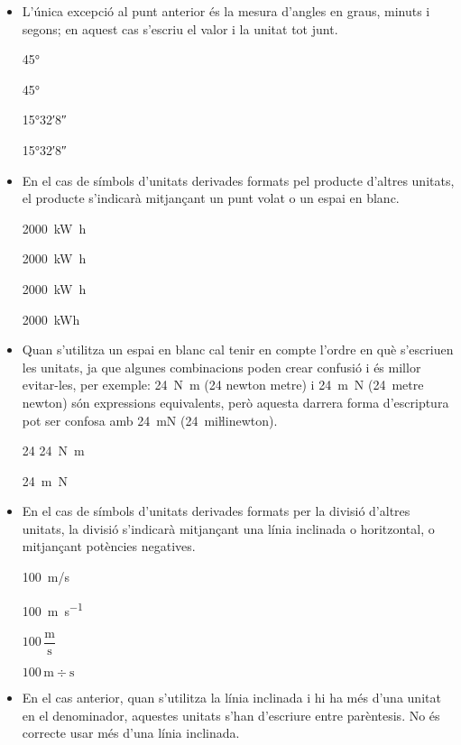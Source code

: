 \begin{itemize}
\item  L'única excepció al punt anterior és la mesura d'angles en graus, minuts i segons; en aquest cas s'escriu el valor i la unitat tot junt.

\textcolor{Green}\faCheckSquare{} \ang{45}

\textcolor{Red}\faTimesCircle{} \ang[number-angle-product = \,]{45}

\textcolor{Green}\faCheckSquare{} \ang{15;32;8}

\textcolor{Red}\faTimesCircle{} \ang[number-angle-product = \,]{15;32;8}

\item En el cas de símbols d'unitats derivades formats pel producte
d'altres unitats, el producte s'indicarà mitjançant un punt volat o
un espai en blanc.

\textcolor{Green}\faCheckSquare{} \qty[inter-unit-product=\cdot]{2000}{kW.h}

\textcolor{Green}\faCheckSquare{} \qty{2000}{kW.h}

\textcolor{Red}\faTimesCircle{} \qty[inter-unit-product=-]{2000}{kW.h}

\textcolor{Red}\faTimesCircle{} \qty{2000}{kWh}

\item Quan s'utilitza un espai en blanc cal tenir en compte  l'ordre en què s'escriuen
les unitats, ja que algunes combinacions poden crear confusió i
és millor evitar-les, per exemple: \qty{24}{N.m} (24 newton metre) i
\qty{24}{m.N} (24~metre newton) són expressions equivalents, però
aquesta darrera forma d'escriptura pot ser confosa amb \qty{24}{mN} (24~miŀlinewton).

\textcolor{Green}\faCheckSquare{} 24 \qty{24}{N.m}

\textcolor{Blue}\faExclamationTriangle{} \qty{24}{m.N}

\item En el cas de símbols d'unitats derivades formats per la divisió
d'altres unitats, la divisió s'indicarà mitjançant una línia
inclinada o horitzontal, o mitjançant potències negatives.

\textcolor{Green}\faCheckSquare{} \qty{100}{m/s}

\textcolor{Green}\faCheckSquare{} \qty{100}{m.s^{-1}}

\textcolor{Green}\faCheckSquare{} $100\,\dfrac{\text{m}}{\text{s}}$

\textcolor{Red}\faTimesCircle{} $100\,\text{m}\div\text{s}$

\item En el cas anterior, quan s'utilitza la línia inclinada i hi ha més
d'una unitat en el denominador, aquestes unitats s'han d'escriure
entre parèntesis. No és correcte usar més d'una línia inclinada.


\end{itemize}
